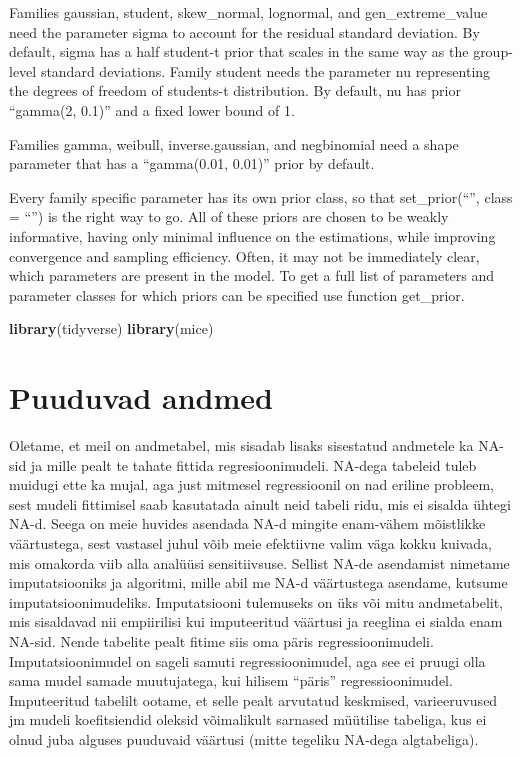 \documentclass[]{book}
\newenvironment{Shaded}{\begin{snugshade}}{\end{snugshade}}
\newcommand{\KeywordTok}[1]{\textcolor[rgb]{0.13,0.29,0.53}{\textbf{#1}}}
\newcommand{\NormalTok}[1]{#1}
\begin{document}
Families gaussian, student, skew\_normal, lognormal, and gen\_extreme\_value need the parameter sigma to account for the residual standard deviation. By default, sigma has a half student-t prior that scales in the same way as the group-level standard deviations.
Family student needs the parameter nu representing the degrees of freedom of students-t distribution. By default, nu has prior ``gamma(2, 0.1)'' and a fixed lower bound of 1.

Families gamma, weibull, inverse.gaussian, and negbinomial need a shape parameter that has a ``gamma(0.01, 0.01)'' prior by default.

Every family specific parameter has its own prior class, so that set\_prior(``'', class = ``'') is the right way to go. All of these priors are chosen to be weakly informative, having only minimal influence on the estimations, while improving convergence and sampling efficiency. Often, it may not be immediately clear, which parameters are present in the model. To get a full list of parameters and parameter classes for which priors can be specified use function get\_prior.

\begin{Shaded}
\begin{Highlighting}[]
\KeywordTok{library}\NormalTok{(tidyverse)}
\KeywordTok{library}\NormalTok{(mice)}
\end{Highlighting}
\end{Shaded}

\hypertarget{puuduvad-andmed}{%
\chapter{Puuduvad andmed}\label{puuduvad-andmed}}

Oletame, et meil on andmetabel, mis sisadab lisaks sisestatud andmetele ka NA-sid ja mille pealt te tahate fittida regresioonimudeli. NA-dega tabeleid tuleb muidugi ette ka mujal, aga just mitmesel regressioonil on nad eriline probleem, sest mudeli fittimisel saab kasutatada ainult neid tabeli ridu, mis ei sisalda ühtegi NA-d. Seega on meie huvides asendada NA-d mingite enam-vähem mõistlikke väärtustega, sest vastasel juhul võib meie efektiivne valim väga kokku kuivada, mis omakorda viib alla analüüsi sensitiivsuse. Sellist NA-de asendamist nimetame imputatsiooniks ja algoritmi, mille abil me NA-d väärtustega asendame, kutsume imputatsioonimudeliks. Imputatsiooni tulemuseks on üks või mitu andmetabelit, mis sisaldavad nii empiirilisi kui imputeeritud väärtusi ja reeglina ei sialda enam NA-sid. Nende tabelite pealt fitime siis oma päris regressioonimudeli. Imputatsioonimudel on sageli samuti regressioonimudel, aga see ei pruugi olla sama mudel samade muutujatega, kui hilisem ``päris'' regressioonimudel. Imputeeritud tabelilt ootame, et selle pealt arvutatud keskmised, varieeruvused jm mudeli koefitsiendid oleksid võimalikult sarnased müütilise tabeliga, kus ei olnud juba alguses puuduvaid väärtusi (mitte tegeliku NA-dega algtabeliga).
\end{document}

